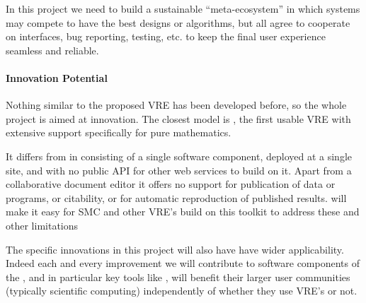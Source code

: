 In this project we need to build a sustainable ``meta-ecosystem'' in
which systems may compete to have the best designs or algorithms, but
all agree to cooperate on interfaces, bug reporting, testing, etc. to
keep the final user experience seamless and reliable.


\paragraph{Innovation Potential}

Nothing similar to the proposed \TheProject VRE has been developed
before, so the whole project is aimed at innovation. 
The closest model
is \SMC, the first usable VRE with extensive support specifically for
pure mathematics.

%
%
It differs from \TheProject in consisting of a single software
component, deployed at a single site, and with no public API
for other web services to build on it.
Apart from a collaborative document editor it offers no support for
publication of data or programs, or citability, or for automatic
reproduction of published results.
\TheProject will make it easy for SMC and other VRE's build on this
toolkit to address these and other limitations

The specific innovations in this project will also have have wider
applicability. Indeed each and every improvement we will contribute to
software components of the \TheProject, and in particular key tools
like \Jupyter, will benefit their larger user communities (typically
scientific computing) independently of whether they use VRE's or not.



